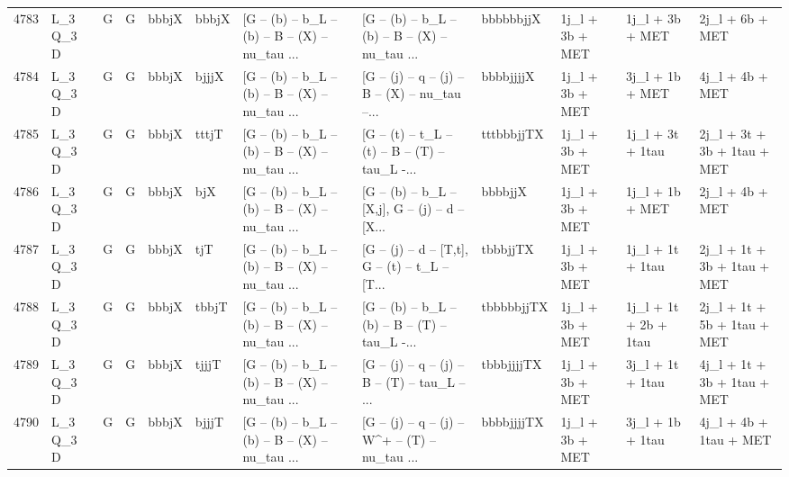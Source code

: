 \begin{tabular}{llllllllllll}
4783 &    L\_3 Q\_3 D &     G &     G &       bbbjX &       bbbjX &  [G -- (b) -- b\_L -- (b) -- B -- (X) -- nu\_tau ... &  [G -- (b) -- b\_L -- (b) -- B -- (X) -- nu\_tau ... &   bbbbbbjjX &          1j\_l + 3b + MET &          1j\_l + 3b + MET &                    2j\_l + 6b + MET \\
4784 &    L\_3 Q\_3 D &     G &     G &       bbbjX &       bjjjX &  [G -- (b) -- b\_L -- (b) -- B -- (X) -- nu\_tau ... &  [G -- (j) -- q -- (j) -- B -- (X) -- nu\_tau --... &   bbbbjjjjX &          1j\_l + 3b + MET &          3j\_l + 1b + MET &                    4j\_l + 4b + MET \\
4785 &    L\_3 Q\_3 D &     G &     G &       bbbjX &       tttjT &  [G -- (b) -- b\_L -- (b) -- B -- (X) -- nu\_tau ... &  [G -- (t) -- t\_L -- (t) -- B -- (T) -- tau\_L -... &  tttbbbjjTX &          1j\_l + 3b + MET &         1j\_l + 3t + 1tau &        2j\_l + 3t + 3b + 1tau + MET \\
4786 &    L\_3 Q\_3 D &     G &     G &       bbbjX &         bjX &  [G -- (b) -- b\_L -- (b) -- B -- (X) -- nu\_tau ... &  [G -- (b) -- b\_L -- [X,j], G -- (j) -- d -- [X... &     bbbbjjX &          1j\_l + 3b + MET &          1j\_l + 1b + MET &                    2j\_l + 4b + MET \\
4787 &    L\_3 Q\_3 D &     G &     G &       bbbjX &         tjT &  [G -- (b) -- b\_L -- (b) -- B -- (X) -- nu\_tau ... &  [G -- (j) -- d -- [T,t], G -- (t) -- t\_L -- [T... &    tbbbjjTX &          1j\_l + 3b + MET &         1j\_l + 1t + 1tau &        2j\_l + 1t + 3b + 1tau + MET \\
4788 &    L\_3 Q\_3 D &     G &     G &       bbbjX &       tbbjT &  [G -- (b) -- b\_L -- (b) -- B -- (X) -- nu\_tau ... &  [G -- (b) -- b\_L -- (b) -- B -- (T) -- tau\_L -... &  tbbbbbjjTX &          1j\_l + 3b + MET &    1j\_l + 1t + 2b + 1tau &        2j\_l + 1t + 5b + 1tau + MET \\
4789 &    L\_3 Q\_3 D &     G &     G &       bbbjX &       tjjjT &  [G -- (b) -- b\_L -- (b) -- B -- (X) -- nu\_tau ... &  [G -- (j) -- q -- (j) -- B -- (T) -- tau\_L -- ... &  tbbbjjjjTX &          1j\_l + 3b + MET &         3j\_l + 1t + 1tau &        4j\_l + 1t + 3b + 1tau + MET \\
4790 &    L\_3 Q\_3 D &     G &     G &       bbbjX &       bjjjT &  [G -- (b) -- b\_L -- (b) -- B -- (X) -- nu\_tau ... &  [G -- (j) -- q -- (j) -- W\textasciicircum + -- (T) -- nu\_tau ... &  bbbbjjjjTX &          1j\_l + 3b + MET &         3j\_l + 1b + 1tau &             4j\_l + 4b + 1tau + MET \\

\end{tabular}
